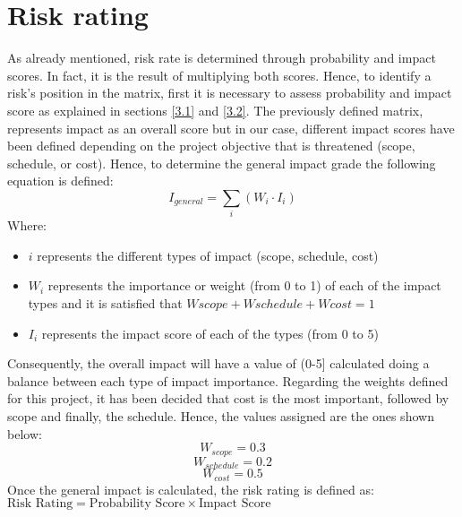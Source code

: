 \section{Risk rating}
As already mentioned, risk rate is determined through probability and impact scores. In fact, it is the result of multiplying both scores. Hence, to identify a risk’s position in the matrix, first it is necessary to assess probability and impact score as explained in sections \ref{3.1} and \ref{3.2}.
The previously defined matrix, represents impact as an overall score but in our case, different impact scores have been defined depending on the project objective that is threatened (scope, schedule, or cost). Hence, to determine the general impact grade the following equation is defined:
\begin{equation}
I_{general}=\sum_{i}(W_i\cdot I_i)
\end{equation}
Where:
\begin{itemize}
	\item $i$ represents the different types of impact (scope, schedule, cost)
	\item $W_i$ represents the importance or weight (from 0 to 1) of each of the impact types and it is satisfied that $Wscope + Wschedule + Wcost = 1$
	\item $I_i$ represents the impact score of each of the types (from 0 to 5)
\end{itemize}

Consequently, the overall impact will have a value of (0-5] calculated doing a balance between each type of impact importance.
Regarding the weights defined for this project, it has been decided that cost is the most important, followed by scope and finally, the schedule. Hence, the values assigned are the ones shown  below:
	$$W_{scope}=0.3$$
	$$W_{schedule}=0.2$$
	$$W_{cost}=0.5$$
Once the general impact is calculated, the risk rating is defined as:
$\text{Risk Rating}=\text{Probability Score}\times \text{Impact Score}$

